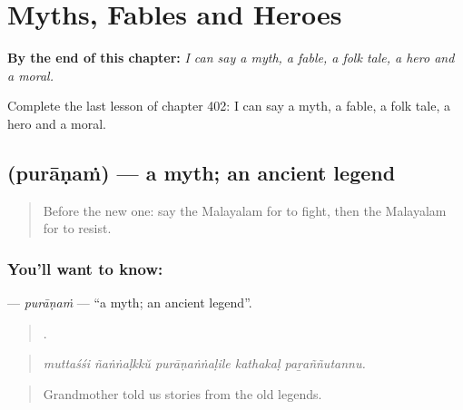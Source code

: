 
\chapter{Myths, Fables and Heroes}
\label{ch:ml-myths-fables-and-heroes}

\begin{chapteropening}
\textbf{By the end of this chapter:} \emph{I can say a myth, a fable, a folk tale, a hero and a moral.}

Complete the last lesson of chapter 402: I can say a myth, a fable, a folk tale, a hero and a moral.
\end{chapteropening}

\section[\texorpdfstring{\ml{പുരാണം} (purāṇaṁ)}{പുരാണം (purāṇaṁ)}]{ (purāṇaṁ) — a myth; an ancient legend}

\label{lesson:ML-C402-puranam}



\begin{quote}
Before the new one: say the Malayalam for to fight, then the Malayalam for to resist.
\end{quote}

\subsection*{You'll want to know: }
\textbf{} — \emph{purāṇaṁ} — \textquotedblleft{}a myth; an ancient legend\textquotedblright{}.

\begin{quote}
    .
\end{quote}

\begin{quote}
\emph{muttaśśi ñaṅṅaḷkkŭ purāṇaṅṅaḷile kathakaḷ paṟaññutannu.}
\end{quote}

\begin{quote}
Grandmother told us stories from the old legends.
\end{quote}

